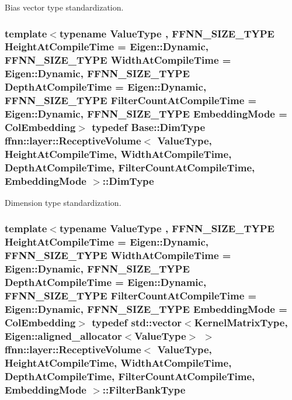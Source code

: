 Bias vector type standardization. 

\hypertarget{classffnn_1_1layer_1_1_receptive_volume_ab0bd7607040aa08bf9cdfcc30e2794ef}{
\subsubsection[{Dim\-Type}]{\setlength{\rightskip}{0pt plus 5cm}template$<$typename Value\-Type , F\-F\-N\-N\-\_\-\-S\-I\-Z\-E\-\_\-\-T\-Y\-P\-E Height\-At\-Compile\-Time = Eigen\-::\-Dynamic, F\-F\-N\-N\-\_\-\-S\-I\-Z\-E\-\_\-\-T\-Y\-P\-E Width\-At\-Compile\-Time = Eigen\-::\-Dynamic, F\-F\-N\-N\-\_\-\-S\-I\-Z\-E\-\_\-\-T\-Y\-P\-E Depth\-At\-Compile\-Time = Eigen\-::\-Dynamic, F\-F\-N\-N\-\_\-\-S\-I\-Z\-E\-\_\-\-T\-Y\-P\-E Filter\-Count\-At\-Compile\-Time = Eigen\-::\-Dynamic, F\-F\-N\-N\-\_\-\-S\-I\-Z\-E\-\_\-\-T\-Y\-P\-E Embedding\-Mode = Col\-Embedding$>$ typedef {\bf Base\-::\-Dim\-Type} {\bf ffnn\-::layer\-::\-Receptive\-Volume}$<$ Value\-Type, Height\-At\-Compile\-Time, Width\-At\-Compile\-Time, Depth\-At\-Compile\-Time, Filter\-Count\-At\-Compile\-Time, {\bf Embedding\-Mode} $>$\-::{\bf Dim\-Type}}}\label{classffnn_1_1layer_1_1_receptive_volume_ab0bd7607040aa08bf9cdfcc30e2794ef}


Dimension type standardization. 

\hypertarget{classffnn_1_1layer_1_1_receptive_volume_a7c97795baaf3c9b1e7db3cb3841d8829}{
\subsubsection[{Filter\-Bank\-Type}]{\setlength{\rightskip}{0pt plus 5cm}template$<$typename Value\-Type , F\-F\-N\-N\-\_\-\-S\-I\-Z\-E\-\_\-\-T\-Y\-P\-E Height\-At\-Compile\-Time = Eigen\-::\-Dynamic, F\-F\-N\-N\-\_\-\-S\-I\-Z\-E\-\_\-\-T\-Y\-P\-E Width\-At\-Compile\-Time = Eigen\-::\-Dynamic, F\-F\-N\-N\-\_\-\-S\-I\-Z\-E\-\_\-\-T\-Y\-P\-E Depth\-At\-Compile\-Time = Eigen\-::\-Dynamic, F\-F\-N\-N\-\_\-\-S\-I\-Z\-E\-\_\-\-T\-Y\-P\-E Filter\-Count\-At\-Compile\-Time = Eigen\-::\-Dynamic, F\-F\-N\-N\-\_\-\-S\-I\-Z\-E\-\_\-\-T\-Y\-P\-E Embedding\-Mode = Col\-Embedding$>$ typedef std\-::vector$<${\bf Kernel\-Matrix\-Type}, Eigen\-::aligned\-\_\-allocator$<$Value\-Type$>$ $>$ {\bf ffnn\-::layer\-::\-Receptive\-Volume}$<$ Value\-Type, Height\-At\-Compile\-Time, Width\-At\-Compile\-Time, Depth\-At\-Compile\-Time, Filter\-Count\-At\-Compile\-Time, {\bf Embedding\-Mode} $>$\-::{\bf Filter\-Bank\-Type}}}\label{classffnn_1_1layer_1_1_receptive_volume_a7c97795baaf3c9b1e7db3cb3841d8829}


